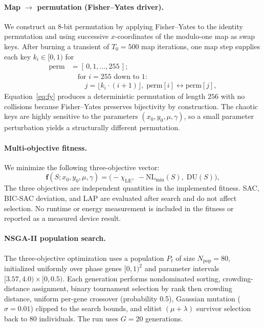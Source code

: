 \documentclass[11pt,a4paper]{article}
\begin{document}
\paragraph{Map $\rightarrow$ permutation (Fisher--Yates driver).}
We construct an 8-bit permutation by applying Fisher--Yates to the
identity permutation and using successive $x$-coordinates of the
modulo-one map as swap keys. After burning a transient of $T_0=500$
map iterations, one map step supplies each key $k_i\in[0,1)$ for
\begin{equation}
  \begin{aligned}
    \mathrm{perm} &= [\,0, 1, \ldots, 255\,]; \\
    &\quad \text{for } i = 255 \text{ down to } 1: \\
    &\qquad j = \lfloor k_i \cdot (i + 1) \rfloor,\;
    \mathrm{perm}[i] \leftrightarrow \mathrm{perm}[j],
  \end{aligned}
  \label{eq:fy}
\end{equation}
Equation~\ref{eq:fy} produces a deterministic permutation of length
$256$ with no collisions because Fisher--Yates preserves bijectivity
by construction. The chaotic keys are highly sensitive to the
parameters $(x_0, y_0, \mu, \gamma)$, so a small parameter
perturbation yields a structurally different permutation.

\paragraph{Multi-objective fitness.}
We minimize the following three-objective vector:
\begin{equation}
  \mathbf{f}(S; x_0, y_0, \mu, \gamma) =
  \bigl( -\chi_\mathrm{LE},\;
         -\mathrm{NL}_{\min}(S),\;
         \mathrm{DU}(S) \bigr),
  \label{eq:fit}
\end{equation}
The three objectives are independent quantities in the implemented
fitness. SAC, BIC-SAC deviation, and LAP are evaluated after search
and do not affect selection. No runtime or energy measurement is
included in the fitness or reported as a measured device result.

\paragraph{NSGA-II population search.}
The three-objective optimization uses a population $P_t$ of size
$N_\mathrm{pop}=80$, initialized uniformly over phase genes
$[0,1)^2$ and parameter intervals $[3.57,4.0)\times[0,0.5)$. Each generation
performs nondominated sorting, crowding-distance assignment, binary
tournament selection by rank then crowding distance, uniform
per-gene crossover (probability 0.5), Gaussian mutation
($\sigma=0.01$) clipped to the search bounds, and elitist
$(\mu+\lambda)$ survivor selection back to 80 individuals. The run
uses $G=20$ generations.
\end{document}
